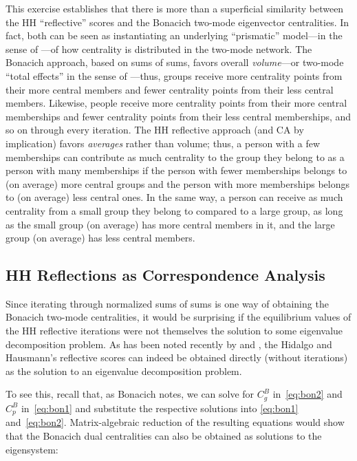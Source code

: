\documentclass[a4paper,fleqn]{cas-sc}
\begin{document}
This exercise establishes that there is more than a superficial similarity between the HH ``reflective'' scores and the Bonacich two-mode eigenvector centralities. In fact, both can be seen as instantiating an underlying ``prismatic'' model---in the sense of \citet{podolny2001networks}---of how centrality is distributed in the two-mode network. The Bonacich approach, based on sums of sums, favors overall \textit{volume}---or two-mode ``total effects'' in the sense of \citet{friedkin1991theoretical}---thus, groups receive more centrality points from their more central members and fewer centrality points from their less central members. Likewise, people receive more centrality points from their more central memberships and fewer centrality points from their less central memberships, and so on through every iteration. The HH reflective approach (and CA by implication) favors \textit{averages} rather than volume; thus, a person with a few memberships can contribute as much centrality to the group they belong to as a person with many memberships if the person with fewer memberships belongs to (on average) more central groups and the person with more memberships belongs to (on average) less central ones. In the same way, a person can receive as much centrality from a small group they belong to compared to a large group, as long as the small group (on average) has more central members in it, and the large group (on average) has less central members.  

\subsection{HH Reflections as Correspondence Analysis} \label{subsec:refeigen}
Since iterating through normalized sums of sums is one way of obtaining the Bonacich two-mode centralities, it would be surprising if the equilibrium values of the HH reflective iterations were not themselves the solution to some eigenvalue decomposition problem. As has been noted recently by \citet{mealy2019interpreting} and \citet{van2021correspondence}, the Hidalgo and Hausmann's \citeyearpar{hidalgo2009building} reflective scores can indeed be obtained directly (without iterations) as the solution to an eigenvalue decomposition problem. 

To see this, recall that, as Bonacich \citeyearpar[157]{bonacich1991simultaneous} notes, we can solve for $C^B_g$ in~\ref{eq:bon2} and $C^B_p$ in~\ref{eq:bon1} and substitute the respective solutions into \ref{eq:bon1} and~\ref{eq:bon2}. Matrix-algebraic reduction of the resulting equations would show that the Bonacich dual centralities can also be obtained as solutions to the eigensystem:
\end{document}
